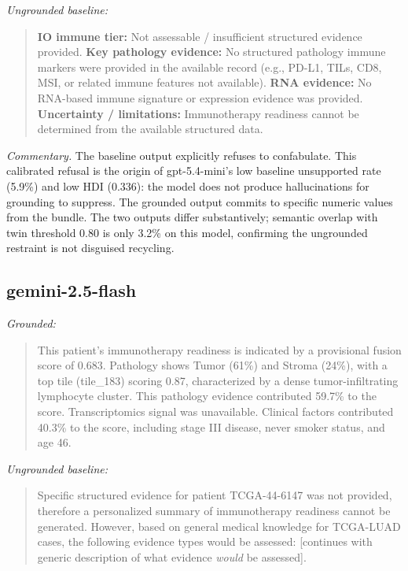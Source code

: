 \documentclass[11pt]{article}
\begin{document}
\noindent\textit{Ungrounded baseline:}
\begin{quote}\small
\textbf{IO immune tier:} Not assessable / insufficient structured evidence provided.
\textbf{Key pathology evidence:} No structured pathology immune markers were provided in the available record (e.g., PD-L1, TILs, CD8, MSI, or related immune features not available).
\textbf{RNA evidence:} No RNA-based immune signature or expression evidence was provided.
\textbf{Uncertainty / limitations:} Immunotherapy readiness cannot be determined from the available structured data.
\end{quote}

\emph{Commentary.} The baseline output explicitly refuses to confabulate. This calibrated refusal is the origin of gpt-5.4-mini's low baseline unsupported rate (5.9\%) and low HDI (0.336): the model does not produce hallucinations for grounding to suppress. The grounded output commits to specific numeric values from the bundle. The two outputs differ substantively; semantic overlap with twin threshold 0.80 is only 3.2\% on this model, confirming the ungrounded restraint is not disguised recycling.

\subsection{gemini-2.5-flash}

\noindent\textit{Grounded:}
\begin{quote}\small
This patient's immunotherapy readiness is indicated by a provisional fusion score of 0.683. Pathology shows Tumor (61\%) and Stroma (24\%), with a top tile (tile\_183) scoring 0.87, characterized by a dense tumor-infiltrating lymphocyte cluster. This pathology evidence contributed 59.7\% to the score. Transcriptomics signal was unavailable. Clinical factors contributed 40.3\% to the score, including stage III disease, never smoker status, and age 46.
\end{quote}

\noindent\textit{Ungrounded baseline:}
\begin{quote}\small
Specific structured evidence for patient TCGA-44-6147 was not provided, therefore a personalized summary of immunotherapy readiness cannot be generated. However, based on general medical knowledge for TCGA-LUAD cases, the following evidence types would be assessed: [continues with generic description of what evidence \emph{would} be assessed].
\end{quote}
\end{document}
